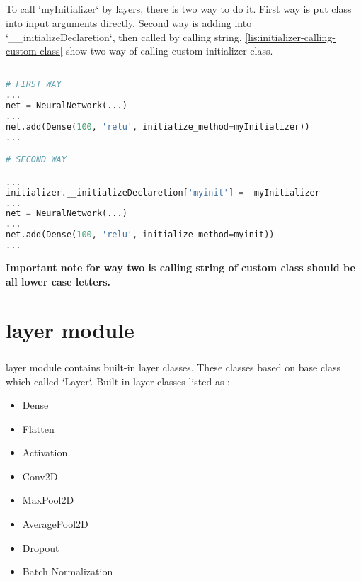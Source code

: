 \documentclass[12pt]{report}
\begin{document}
\paragraph{}
To call `myInitializer` by layers, there is two way to do it. First way is put class into input arguments directly. Second way is adding into  `\_\_initializeDeclaretion`, then called by calling string. \ref{lis:initializer-calling-custom-class} show two way of calling custom initializer class.

\begin{lstlisting}[language=Python, numbers=none, caption={Calling custom initializer class.}, label={lis:initializer-calling-custom-class}]

# FIRST WAY
...
net = NeuralNetwork(...)
...
net.add(Dense(100, 'relu', initialize_method=myInitializer))
...

# SECOND WAY

...
initializer.__initializeDeclaretion['myinit'] =  myInitializer
...
net = NeuralNetwork(...)
...
net.add(Dense(100, 'relu', initialize_method=myinit))
...

\end{lstlisting}

\textbf{Important note for way two is calling string of custom class should be all lower case letters. }





\chapter{layer module}
\label{ch:layer}

\paragraph{}
layer module contains built-in layer classes. These classes based on base class which called `Layer`. Built-in layer classes listed as : 

\begin{itemize}
	\item Dense
	\item Flatten
	\item Activation
	\item Conv2D
	\item MaxPool2D
	\item AveragePool2D
	\item Dropout
	\item Batch Normalization	
\end{itemize}
\end{document}
